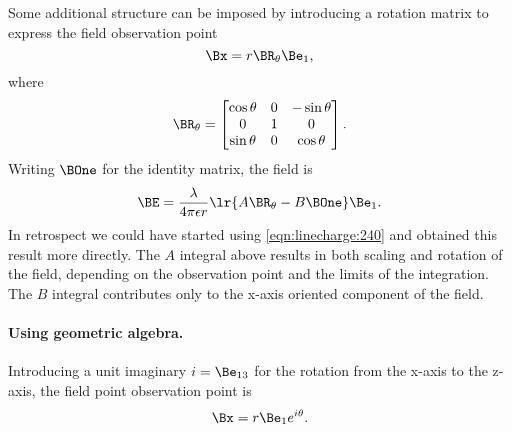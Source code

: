 Some additional structure can be imposed by introducing a rotation matrix to express the field observation point
\begin{dmath}\label{eqn:linecharge:240}
\Bx = r \BR_\theta \Be_1,
\end{dmath}
where
\begin{equation}\label{eqn:linecharge:260}
\BR_\theta =
\begin{bmatrix}
\cos\theta & 0 & -\sin\theta \\
0 & 1 & 0 \\
\sin\theta & 0 & \cos\theta \\
\end{bmatrix}.
\end{equation}
Writing \( \BOne \) for the  identity matrix, the field is
\begin{dmath}\label{eqn:linecharge:280}
\BE = \frac{\lambda}{4 \pi \epsilon r} \lr{ A \BR_\theta - B \BOne } \Be_1.
\end{dmath}
In retrospect we could have started using \cref{eqn:linecharge:240} and obtained this result more directly.
The \( A \) integral above results in both scaling and rotation of the field, depending on the observation point and the limits of the integration.  The \( B \) integral contributes only to the x-axis oriented component of the field.

\paragraph{Using geometric algebra.}

Introducing a unit imaginary \( i = \Be_{13} \) for the rotation from the x-axis to the z-axis, the field point observation point is
\begin{dmath}\label{eqn:linecharge:120}
\Bx = r \Be_1 e^{i \theta}.
\end{dmath}

